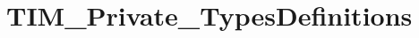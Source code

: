 \hypertarget{group___t_i_m___private___types_definitions}{}\section{T\+I\+M\+\_\+\+Private\+\_\+\+Types\+Definitions}
\label{group___t_i_m___private___types_definitions}
